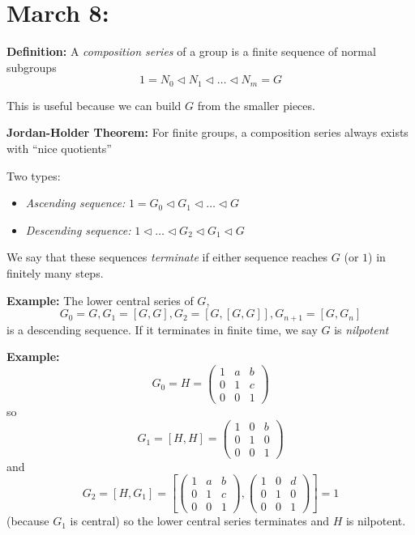 \documentclass[12pt]{article}
\begin{document}
\section{March 8:}
    \textbf{Definition:} A \emph{composition series} of a group is a finite sequence of normal subgroups 
    \[1 = N_0 \triangleleft N_1 \triangleleft \dots \triangleleft N_m = G\]

    This is useful because we can build $G$ from the smaller pieces. 

    \textbf{Jordan-Holder Theorem:} For finite groups, a composition series always exists with ``nice quotients'' 

    Two types:
    \begin{itemize}
        \item \emph{Ascending sequence:} $1  = G_0 \triangleleft G_1 \triangleleft \dots \triangleleft G$ 
        \item \emph{Descending sequence:} $1 \triangleleft \dots \triangleleft G_2 \triangleleft G_1 \triangleleft G$
    \end{itemize}

    We say that these sequences \emph{terminate} if either sequence reaches $G$ (or $1$) in finitely many steps. 

    \textbf{Example:} The lower central series of $G$, 
    \[G_0 = G, G_1 = [G, G], G_2 = [G, [G, G]], G_{n+1} = [G, G_n]\]
    is a descending sequence. If it terminates in finite time, we say $G$ is \emph{nilpotent}

    \textbf{Example:} 
    \[G_0 = H = \begin{pmatrix}
        1 & a & b\\ 
        0 & 1 & c\\ 
        0 & 0 & 1
    \end{pmatrix}\]
    so 
    \[G_1 = [H, H] = \begin{pmatrix}
        1 & 0 & b\\ 
        0 & 1 & 0\\ 
        0 & 0 & 1
    \end{pmatrix}\]
    and 
    \[G_2 = [H, G_1] = \left[\begin{pmatrix}
        1 & a & b\\ 
        0 & 1 & c\\ 
        0 & 0 & 1
    \end{pmatrix}, \begin{pmatrix}
        1 & 0 & d\\ 
        0 & 1 & 0\\ 
        0 & 0 & 1
    \end{pmatrix}\right] = 1\] 
    (because $G_1$ is central) so the lower central series terminates and $H$ is nilpotent. 
\end{document}
